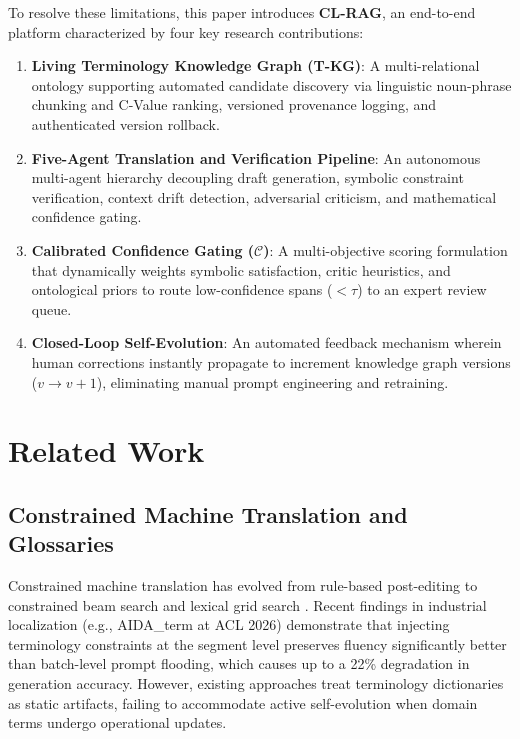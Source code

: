 \documentclass[conference]{IEEEtran}
\begin{document}
To resolve these limitations, this paper introduces \textbf{CL-RAG}, an end-to-end platform characterized by four key research contributions:
\begin{enumerate}
    \item \textbf{Living Terminology Knowledge Graph (T-KG)}: A multi-relational ontology supporting automated candidate discovery via linguistic noun-phrase chunking and C-Value ranking, versioned provenance logging, and authenticated version rollback.
    \item \textbf{Five-Agent Translation and Verification Pipeline}: An autonomous multi-agent hierarchy decoupling draft generation, symbolic constraint verification, context drift detection, adversarial criticism, and mathematical confidence gating.
    \item \textbf{Calibrated Confidence Gating ($\mathcal{C}$)}: A multi-objective scoring formulation that dynamically weights symbolic satisfaction, critic heuristics, and ontological priors to route low-confidence spans ($< \tau$) to an expert review queue.
    \item \textbf{Closed-Loop Self-Evolution}: An automated feedback mechanism wherein human corrections instantly propagate to increment knowledge graph versions ($v \rightarrow v+1$), eliminating manual prompt engineering and retraining.
\end{enumerate}

\section{Related Work}

\subsection{Constrained Machine Translation and Glossaries}
Constrained machine translation has evolved from rule-based post-editing to constrained beam search and lexical grid search \cite{post2018call}. Recent findings in industrial localization (e.g., AIDA\_term at ACL 2026) demonstrate that injecting terminology constraints at the segment level preserves fluency significantly better than batch-level prompt flooding, which causes up to a 22\% degradation in generation accuracy. However, existing approaches treat terminology dictionaries as static artifacts, failing to accommodate active self-evolution when domain terms undergo operational updates.
\end{document}
